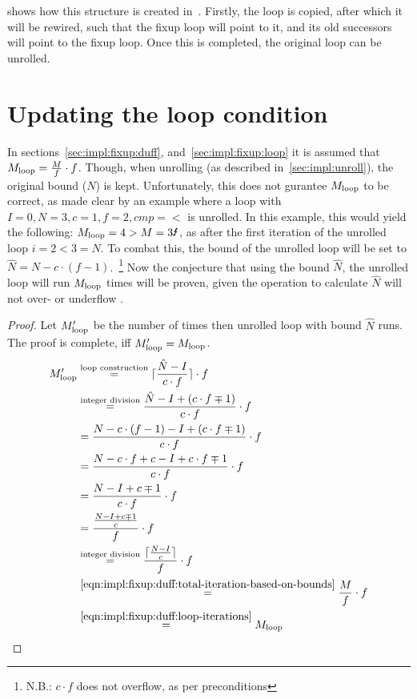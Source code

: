  shows how this structure is created in~\libFIRM.
Firstly, the loop is copied, after which it will be rewired, such that the fixup loop will point to it, and its old successors will point to the fixup loop.
Once this is completed, the original loop can be unrolled.



\section{Updating the loop condition}\label{sec:impl:fixup:header-cond}

In sections~\ref{sec:impl:fixup:duff}, and~\ref{sec:impl:fixup:loop} it is assumed that $M_{\text{loop}} = \frac{M}{f} \cdot f$.
Though, when unrolling (as described in~\cref{sec:impl:unroll}), the original bound ($N$) is kept.
Unfortunately, this does not gurantee $M_{\text{loop}}$ to be correct, as made clear by an example where a loop with $I = 0, N = 3, c = 1, f = 2, cmp = <$ is unrolled.
In this example, this would yield the following: $\Mloop = 4 > M = 3 \mLightning$, as after the first iteration of the unrolled loop $i = 2 < 3 = N$.
To combat this, the bound of the unrolled loop will be set to $\hat{N} = N - c \cdot (f - 1)$.~\footnote{N.B.: $c \cdot f$ does not overflow, as per preconditions}
Now the conjecture that using the bound $\hat{N}$, the unrolled loop will run $M_{\text{loop}}$ times will be proven, given the operation to calculate $\hat{N}$ will not over- or underflow .
\begin{proof}
    Let $M_{\text{loop}}'$ be the number of times then unrolled loop with bound $\hat{N}$ runs.
    The proof is complete, iff $M_{\text{loop}}' = M_{\text{loop}}$.
    \begin{align*}
        M_{\text{loop}}' &\overset{\text{loop construction}}{=} \lceil{}\frac{\hat{N} - I}{c \cdot f}\rceil{} \cdot f\\
        &\overset{\text{integer division}}{=} \frac{\hat{N} - I + (c \cdot f \mp 1)}{c \cdot f} \cdot f\\
        &= \frac{N - c \cdot (f - 1) - I + (c \cdot f \mp 1)}{c \cdot f} \cdot f\\
        &= \frac{N - c \cdot f + c - I + c \cdot f \mp 1}{c \cdot f} \cdot f\\
        &= \frac{N - I + c \mp 1}{c \cdot f} \cdot f\\
        &= \frac{\frac{N - I + c \mp 1}{c}}{f} \cdot f\\
        &\overset{\text{integer division}}{=} \frac{\lceil{}\frac{N - I}{c}\rceil{}}{f} \cdot f\\
        &\overset{\ref{eqn:impl:fixup:duff:total-iteration-based-on-bounds}}{=} \frac{M}{f} \cdot f\\
        &\overset{\ref{eqn:impl:fixup:duff:loop-iterations}}{=} M_{\text{loop}}
    \end{align*}
\end{proof}


